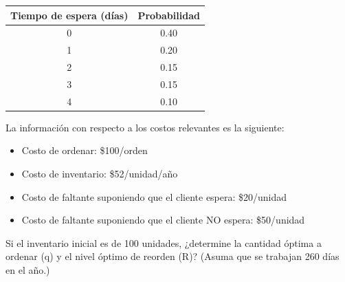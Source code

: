 \documentclass[12pt]{article}
\begin{document}
\begin{center}
\begin{tabular}{cc}
\toprule
Tiempo de espera (días) & Probabilidad \\
\midrule
0 & 0.40 \\
1 & 0.20 \\
2 & 0.15 \\
3 & 0.15 \\
4 & 0.10 \\
\bottomrule
\end{tabular}
\end{center}

La información con respecto a los costos relevantes es la siguiente:

\begin{itemize}
    \item Costo de ordenar: \$100/orden
    \item Costo de inventario: \$52/unidad/año
    \item Costo de faltante suponiendo que el cliente espera: \$20/unidad
    \item Costo de faltante suponiendo que el cliente NO espera: \$50/unidad
\end{itemize}

Si el inventario inicial es de 100 unidades, ¿determine la cantidad óptima a ordenar (q) y el nivel óptimo de reorden (R)? (Asuma que se trabajan 260 días en el año.)
\end{document}
